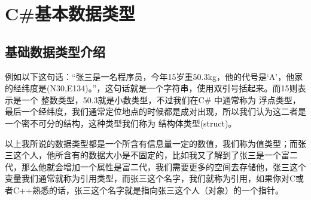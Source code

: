 \chapter{C\#基本数据类型}
\section{基础数据类型介绍}
例如以下这句话：“张三是一名程序员，今年15岁重50.3kg，他的代号是‘A’，他家的经纬度是(N30,E134)。”，这句话就是一个字符串，使用双引号括起来。而15则表示是一个 整数类型，50.3就是小数类型，不过我们在C\# 中通常称为 浮点类型，最后一个经纬度，我们通常定位地点的时候都是成对出现，所以我们认为这二者是一个密不可分的结构，这种类型我们称为 结构体类型(struct)。

以上我所说的数据类型都是一个所含有信息量一定的数值，我们称为值类型；而张三这个人，他所含有的数据大小是不固定的，比如我又了解到了张三是一个富二代，那么他就会增加一个属性是富二代，我们需要更多的空间去存储他，张三这个变量我们通常就称为引用类型，而张三这个名字，我们就称为引用，如果你对C或者C++熟悉的话，张三这个名字就是指向张三这个人（对象）的一个指针。